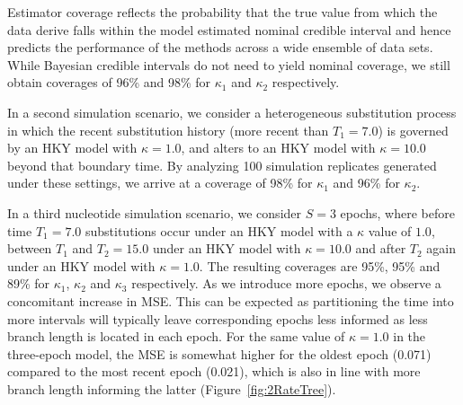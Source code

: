 Estimator coverage reflects the probability that the true value from which the data derive falls within the model estimated nominal 
credible interval and hence predicts the performance of the methods across a wide ensemble of data sets.
While Bayesian credible intervals do not need to yield nominal coverage, we still obtain coverages of 96\% and 98\% for $\kappa_{1}$ and $\kappa_{2}$ respectively.

In a second simulation scenario, we consider a heterogeneous substitution process in which the recent substitution history (more recent than $T_{1}=7.0$) is governed by an HKY model with $\kappa = 1.0$, and alters to an HKY model with $\kappa = 10.0$ beyond that boundary time. 
By analyzing 100 simulation replicates generated under these settings, we arrive at a coverage of 98\% for $\kappa_{1}$ and 96\% for $\kappa_{2}$.

In a third nucleotide simulation scenario, we consider $S=3$ epochs, where before time $T_{1}=7.0$ substitutions occur under an HKY model with a $\kappa$ value of $1.0$, between $T_{1}$ and $T_{2}=15.0$ under an HKY model with $\kappa=10.0$ and after $T_{2}$ again under an HKY model with $\kappa=1.0$. 
The resulting coverages are 95\%, 95\% and 89\% for $\kappa_{1}$, $\kappa_{2}$ and $\kappa_{3}$ respectively. 
As we introduce more epochs, we observe a concomitant increase in MSE.
This can be expected as partitioning the time into more intervals will typically leave corresponding epochs less informed as less branch length is located in each epoch. 
For the same value of $\kappa = 1.0$ in the three-epoch model, the MSE is somewhat higher for the oldest epoch (0.071) compared to the most recent epoch (0.021), which is also in line with more branch length informing the latter (Figure~\ref{fig:2RateTree}).

